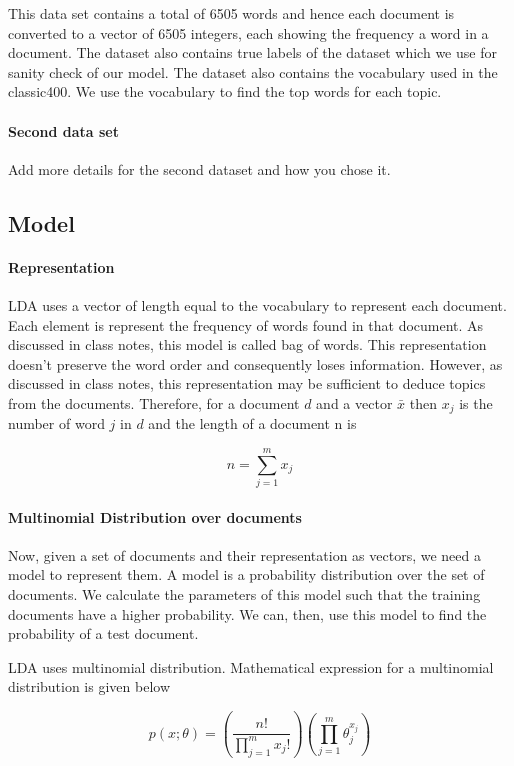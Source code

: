 \documentclass[11pt,a4paper,oneside]{article}
\begin{document}
This data set contains a total of 6505 words and hence each document is converted to a vector of 6505 integers, each showing the frequency a word in a document. The dataset also contains true labels of the dataset which we use for sanity check of our model. The dataset also contains the vocabulary used in the classic400. We use the vocabulary to find the top words for each topic.

\paragraph{Second data set}
Add more details for the second dataset and how you chose it.

\subsection{Model}
\paragraph{Representation}
LDA uses a vector of length equal to the vocabulary to represent each document. Each element is represent the frequency of words found in that document. As discussed in class notes, this model is called bag of words. This representation doesn't preserve the word order and consequently loses information. However, as discussed in class notes, this representation may be sufficient to deduce topics from the documents. Therefore, for a document $d$ and a vector $\bar{x}$ then $x_j$ is the number of word $j$ in $d$ and the length of a document n is

\begin{equation}
	n = \sum^{m}_{j=1}x_j
\end{equation}

\paragraph{Multinomial Distribution over documents}
Now, given a set of documents and their representation as vectors, we need a model to represent them. A model is a probability distribution over the set of documents. We calculate the parameters of this model such that the training documents have a higher probability. We can, then, use this model to find the probability of a test document.

LDA uses multinomial distribution. Mathematical expression for a multinomial distribution is given below

\begin{equation}\label{multinomial}
p(x;\theta) = (\frac{n!}{\prod^m_{j=1}x_j!})(\prod^m_{j=1}\theta^{x_j}_j)
\end{equation}
\end{document}

